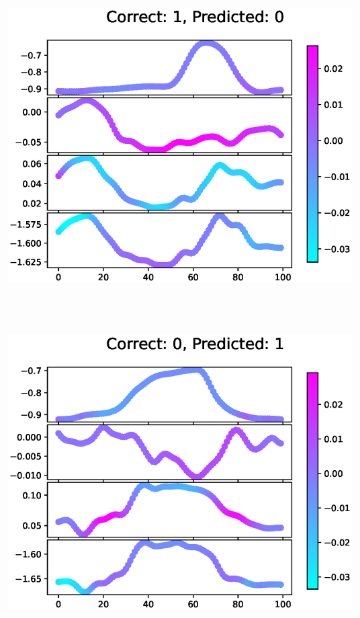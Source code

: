 \begin{figure}[h]
  \begin{subfigure}[t]{0.32\textwidth}
    \includegraphics[width=\textwidth]{files/figs/res/femval/gradcam/10.eps}
    \caption{}
    \label{fig:femval-10}
  \end{subfigure}
  ~
  \begin{subfigure}[t]{0.32\textwidth}
    \includegraphics[width=\textwidth]{files/figs/res/femval/gradcam/01.eps}
    \caption{}
    \label{fig:femval-01}
  \end{subfigure}
  ~
  \begin{subfigure}[t]{0.32\textwidth}

\end{subfigure}
\end{figure}
